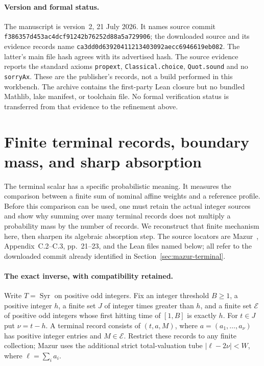 \documentclass[11pt]{article}
\theoremstyle{remark}\newtheorem{remark}[proposition]{Remark}
\begin{document}
\paragraph{Version and formal status.}
The manuscript is version~2, 21 July 2026. It names source
commit \texttt{f386357d453ac4dcf91242b76252d88a5a729906};
the downloaded source and its evidence records name
\texttt{ca3dd0d63920411213403092aecc6946619eb082}.
The latter's main file hash agrees with its advertised hash.
The source evidence reports the standard axioms
\texttt{propext}, \texttt{Classical.choice}, \texttt{Quot.sound}
and no \texttt{sorryAx}. These are the publisher's records,
not a build performed in this workbench. The archive contains
the first-party Lean closure but no bundled Mathlib, lake
manifest, or toolchain file. No formal verification status
is transferred from that evidence to the refinement above.

\section{Finite terminal records, boundary mass, and sharp absorption}
\label{sec:mazur-finite}

The terminal scalar has a specific probabilistic meaning. It measures the
comparison between a finite sum of nominal affine weights and a reference
profile. Before this comparison can be used, one must retain the actual
integer sources and show why summing over many terminal records does not
multiply a probability mass by the number of records. We reconstruct that
finite mechanism here, then sharpen its algebraic absorption step.
The source locators are Mazur~\cite{Mazur2026v2}, Appendix~C.2--C.3,
pp.~21--23, and the Lean files named below; all refer to the downloaded
commit already identified in Section~\ref{sec:mazur-terminal}.

\paragraph{The exact inverse, with compatibility retained.}
Write $T=\operatorname{Syr}$ on positive odd integers. Fix an integer
threshold $B\ge1$, a positive integer $h$, a finite set $J$ of integer
times greater than $h$, and a finite set $\mathcal E$ of positive odd
integers whose first hitting time of $[1,B]$ is exactly $h$.
For $t\in J$ put $\nu=t-h$. A terminal record consists of
$(t,a,M)$, where $a=(a_1,\ldots,a_\nu)$ has positive integer entries
and $M\in\mathcal E$. Restrict these records to any finite collection;
Mazur uses the additional strict total-valuation tube
$|\ell-2\nu|<W$, where $\ell=\sum_i a_i$.
\end{document}
